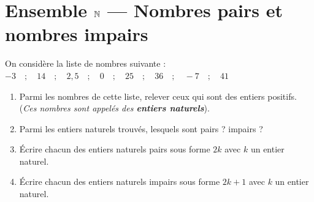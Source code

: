 \documentclass[10pt, a4paper]{article}
\begin{document}
\pagestyle{cours}

\section{Ensemble $\mathbb{N}$ --- Nombres pairs et nombres impairs }

\begin{Activite}[][10 min]
On considère la liste de nombres suivante : 
$-3 \quad ; \quad 14 \quad ; \quad 2,5 \quad ; \quad 0 \quad ; \quad 25 \quad ; \quad 36 \quad ; \quad -7 \quad ; \quad 41$
\begin{enumerate}[leftmargin=*,itemsep=0.5pt]
    \item Parmi les nombres de cette liste, relever ceux qui sont des entiers positifs. \\
    (\textit{Ces nombres sont appelés des \textbf{entiers naturels}}).
    
    \item Parmi les entiers naturels trouvés, lesquels sont pairs ? impairs ?  
        
    \item Écrire chacun des entiers naturels pairs sous forme $2k$ avec $k$ un entier naturel.
    \item Écrire chacun des entiers naturels impairs sous forme $2k+1$ avec $k$ un entier naturel.
\end{enumerate}
\end{Activite}
\end{document}

